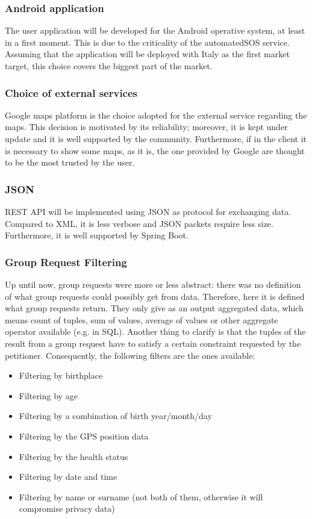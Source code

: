 \subsubsection{Android application} 	 
The user application will be developed for the Android operative system, at least in a first moment. This is due to the criticality of the
automatedSOS service. Assuming that the application will be deployed with Italy as the first market target, this choice covers the biggest
part of the market.

\subsubsection{Choice of external services}
Google maps platform is the choice adopted for the external service regarding the maps. This decision is motivated by its reliability;
moreover, it is kept under update and it is well supported by the community. Furthermore, if in the client it is necessary to show some maps,
as it is, the one provided by Google are thought to be the most trusted by the user. 


\subsubsection{JSON}
REST API will be implemented using JSON as protocol for exchanging data. \\
Compared to XML, it is less verbose and JSON packets require less size. Furthermore, it is well supported
by Spring Boot. 

\subsubsection{Group Request Filtering}
Up until now, group requests were more or less abstract: there was no definition of what group requests could possibly get from 
data. Therefore, here it is defined what group requests return. They only give as an output aggregated data, which means count 
of tuples, sum of values, average of values or other aggregate operator available (e.g. in SQL). Another thing to clarify is that 
the tuples of the result from a group request have to satisfy a certain constraint requested by the petitioner. Consequently, 
the following filters are the ones available:
\begin{itemize}
\item Filtering by birthplace
\item Filtering by age
\item Filtering by a combination of birth year/month/day
\item Filtering by the GPS position data
\item Filtering by the health status
\item Filtering by date and time
\item Filtering by name or surname (not both of them, otherwise it will compromise privacy data)
\end{itemize}